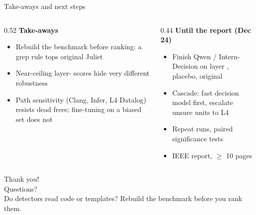 \begin{frame}{Take-aways and next steps}
  \begin{columns}[T]
    \begin{column}{0.52\textwidth}
      \textbf{Take-aways}
      \begin{itemize}\small
        \item Rebuild the benchmark before ranking: a grep rule tops original Juliet
        \item Near-ceiling layer- scores hide very different robustness
        \item Path sensitivity (Clang, Infer, L4 Datalog) resists dead frees; fine-tuning on a biased set does not
      \end{itemize}
    \end{column}
    \begin{column}{0.44\textwidth}
      \textbf{Until the report (Dec 24)}
      \begin{itemize}\small
        \item Finish Qwen / Intern-Decision on layer , placebo, original
        \item Cascade: fast decision model first, escalate unsure units to L4
        \item Repeat runs, paired significance tests
        \item IEEE report, $\ge$ 10 pages
      \end{itemize}
    \end{column}
  \end{columns}
\end{frame}

\begin{frame}[standout]
  Thank you!\\[8pt]
  {\normalsize Questions?}\\[14pt]
  {\small Do detectors read code or templates? Rebuild the benchmark before you rank them.}
\end{frame}
